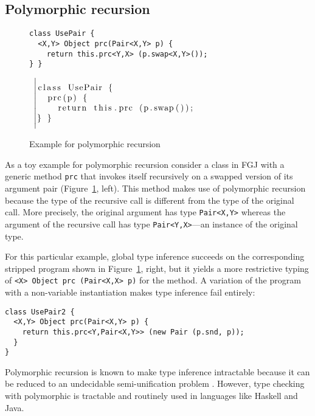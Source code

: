 \subsection{Polymorphic recursion}
\label{sec:polym-recurs}
\begin{figure}[tp]
  \begin{minipage}{0.49\linewidth}
\begin{lstlisting}
class UsePair {
  <X,Y> Object prc(Pair<X,Y> p) {
    return this.prc<Y,X> (p.swap<X,Y>());
} }
\end{lstlisting}
  \end{minipage}
  ~$\left|
  \begin{minipage}{0.49\linewidth}
\begin{lstlisting}
class UsePair {
  prc(p) {
    return this.prc (p.swap());

} }
\end{lstlisting}
  \end{minipage}\right.$
  \caption{Example for polymorphic recursion}
  \label{fig:examples-poly-rec}
\end{figure}

As a toy example for polymorphic recursion consider a class in FGJ with a
generic method \texttt{prc} that invokes itself
recursively on a swapped version of its argument pair
(Figure~\ref{fig:examples-poly-rec}, left).
This method makes use of polymorphic recursion because the type of the
recursive call is different from the type of the original call. More
precisely, the original argument has type \texttt{Pair<X,Y>} whereas
the argument of the recursive call has type
\texttt{Pair<Y,X>}---an instance of the original type.

For this particular example, global type inference succeeds on the
corresponding stripped program shown in
Figure~\ref{fig:examples-poly-rec}, right, but it yields a more restrictive
typing of \texttt{<X> Object prc (Pair<X,X> p)} for the method. 
A variation of the program with a non-variable instantiation makes type inference fail entirely:
\begin{lstlisting}
class UsePair2 {
  <X,Y> Object prc(Pair<X,Y> p) {
    return this.prc<Y,Pair<X,Y>> (new Pair (p.snd, p));
  }
}
\end{lstlisting}



Polymorphic recursion is known to make type inference intractable
\cite{DBLP:journals/toplas/Henglein93,DBLP:journals/toplas/KfouryTU93}
because it can be reduced to an undecidable semi-unification problem
\cite{DBLP:journals/iandc/KfouryTU93}. However, type checking with
polymorphic is tractable and routinely used in languages like Haskell
and Java.


